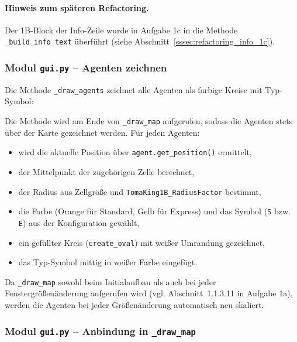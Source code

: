 \paragraph{Hinweis zum späteren Refactoring.}
Der 1B-Block der Info-Zeile wurde in Aufgabe 1c in die Methode \texttt{\_build\_info\_text} überführt (siehe Abschnitt~\ref{sssec:refactoring_info_1c}).


\subsubsection{Modul \texttt{gui.py} – Agenten zeichnen}

Die Methode \texttt{\_draw\_agents} zeichnet alle Agenten als farbige Kreise mit Typ-Symbol:



Die Methode wird am Ende von \texttt{\_draw\_map} aufgerufen, sodass die Agenten stets über der Karte gezeichnet werden. Für jeden Agenten:
\begin{itemize}
    \item wird die aktuelle Position über \texttt{agent.get\_position()} ermittelt,
    \item der Mittelpunkt der zugehörigen Zelle berechnet,
    \item der Radius aus Zellgröße und \texttt{TomaKing1B\_RadiusFactor} bestimmt,
    \item die Farbe (Orange für Standard, Gelb für Express) und das Symbol (\texttt{S} bzw. \texttt{E}) aus der Konfiguration gewählt,
    \item ein gefüllter Kreis (\texttt{create\_oval}) mit weißer Umrandung gezeichnet,
    \item das Typ-Symbol mittig in weißer Farbe eingefügt.
\end{itemize}

Da \texttt{\_draw\_map} sowohl beim Initialaufbau als auch bei jeder Fenstergrößenänderung aufgerufen wird (vgl. Abschnitt~1.1.3.11 in Aufgabe 1a), werden die Agenten bei jeder Größenänderung automatisch neu skaliert.


\subsubsection{Modul \texttt{gui.py} – Anbindung in \texttt{\_draw\_map}}

